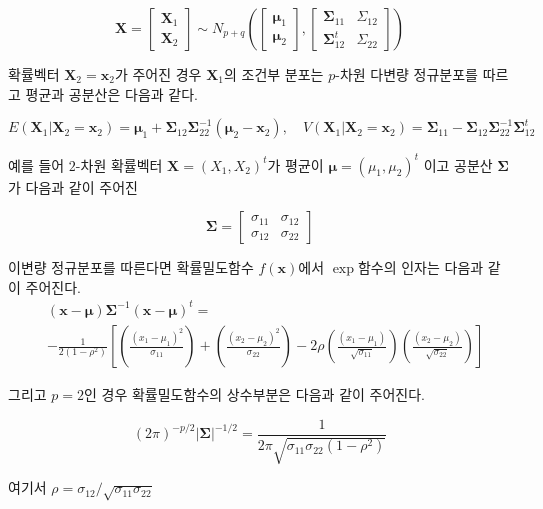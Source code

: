 \documentclass[
  11pt,
  a4paper,
  oneside]{scrbook}
\theoremstyle{definition}
\theoremstyle{plain}
\theoremstyle{definition}
\theoremstyle{definition}
\theoremstyle{remark}
\begin{document}
\[  \pmb X =
    \begin{bmatrix}
  \pmb X_1 \\
  \pmb X_2
  \end{bmatrix}
  \sim
  N_{p+q} \left (
    \begin{bmatrix}
    \pmb \mu_1 \\
    \pmb \mu_2
    \end{bmatrix}
    ,\begin{bmatrix}
    \pmb \Sigma_{11} & \Sigma_{12} \\
    \pmb \Sigma^t_{12} & \Sigma_{22}
    \end{bmatrix}
    \right )
  \]

확률벡터 \(\pmb X_2 = \pmb x_2\)가 주어진 경우 \(\pmb X_1\)의 조건부
분포는 \(p\)-차원 다변량 정규분포를 따르고 평균과 공분산은 다음과 같다.

\[ 
  E(\pmb X_1 | \pmb X_2 = \pmb x_2 ) = \pmb \mu_1 + \pmb \Sigma_{12} \pmb \Sigma^{-1}_{22} (\pmb \mu_2 - \pmb x_2), \quad
  V(\pmb X_1 | \pmb X_2 = \pmb x_2 )  = \pmb \Sigma_{11} -\pmb \Sigma_{12} \pmb \Sigma^{-1}_{22} \pmb \Sigma^t_{12}
  \]

예를 들어 \(2\)-차원 확률벡터 \(\pmb X=(X_1, X_2)^t\)가 평균이
\(\pmb \mu=(\mu_1,\mu_2)^t\) 이고 공분산 \(\pmb \Sigma\)가 다음과 같이
주어진

\[
\pmb \Sigma =
  \begin{bmatrix}
\sigma_{11} & \sigma_{12} \\
\sigma_{12} & \sigma_{22}
\end{bmatrix}
\]

이변량 정규분포를 따른다면 확률밀도함수 \(f(\pmb x)\)에서 \(\exp\)함수의
인자는 다음과 같이 주어진다. \[
\begin{align}
&(\pmb x-\pmb \mu) \pmb \Sigma^{-1}(\pmb x-\pmb \mu)^t
= \\
&-\frac{1}{2 (1-\rho^2)} 
\left [ 
  \left ( \frac{(x_1-\mu_1)^2}{\sigma_{11}} \right )
  +\left ( \frac{(x_2-\mu_2)^2}{\sigma_{22}} \right )
  -2 \rho \left ( \frac{(x_1-\mu_1)}{\sqrt{\sigma_{11}}} \right )
  \left ( \frac{(x_2-\mu_2)}{\sqrt{\sigma_{22}}} \right )
  \right ]
\end{align}
\]

그리고 \(p=2\)인 경우 확률밀도함수의 상수부분은 다음과 같이 주어진다.

\[ (2 \pi)^{-p/2} | \pmb \Sigma|^{-1/2} = \frac{1}{ 2 \pi \sqrt{\sigma_{11} \sigma_{22} (1-\rho^2)}} \]

여기서 \(\rho = \sigma_{12} / \sqrt{\sigma_{11} \sigma_{22}}\)
\end{document}
